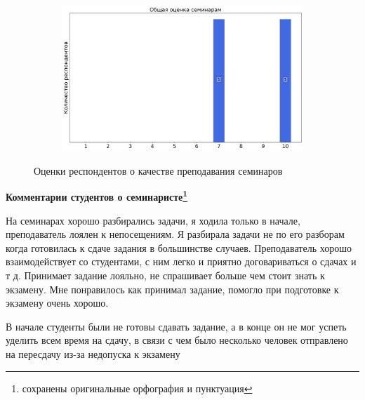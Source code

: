 \begin{figure}[H]
\begin{subfigure}[b]{0.45\textwidth}
			\end{subfigure}
			\begin{subfigure}[b]{0.45\textwidth}
				\centering
				\includegraphics[width=\textwidth]{images/4 course/Квантовая механика/seminarists-marks-Доронин И.-3.png}
			\end{subfigure}	
			\caption{Оценки респондентов о качестве преподавания семинаров}
		\end{figure}

		\textbf{Комментарии студентов о семинаристе\protect\footnote{сохранены оригинальные орфография и пунктуация}}
            \begin{commentbox} 
                На семинарах хорошо разбирались задачи, я ходила только в начале, преподаватель лоялен к непосещениям. Я разбирала задачи не по его разборам когда готовилась к сдаче задания в большинстве случаев. Преподаватель хорошо взаимодействует со студентами, с ним легко и приятно договариваться о сдачах и т д. Принимает задание лояльно, не спрашивает больше чем стоит знать к экзамену. Мне понравилось как принимал задание, помогло при подготовке к экзамену очень хорошо.  
            \end{commentbox} 
        
            \begin{commentbox} 
                В начале студенты были не готовы сдавать задание, а в конце он не мог успеть уделить всем время на сдачу, в связи с чем было несколько человек отправлено на пересдачу из-за недопуска к экзамену  
            \end{commentbox}


